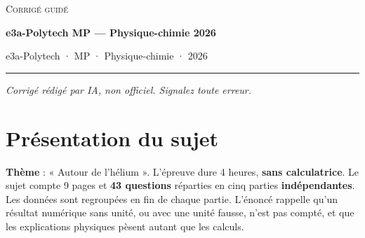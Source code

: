 \documentclass[11pt,a4paper]{article}
\begin{document}
\thispagestyle{plain}
\begin{center}
  {\small\scshape Corrigé guidé}\par\smallskip
  {\LARGE\bfseries e3a-Polytech MP — Physique-chimie 2026\par}\medskip
  {\large e3a-Polytech · MP · Physique-chimie · 2026\par}
\end{center}
\vspace{2pt}\hrule\vspace{8pt}

\emph{Corrigé rédigé par IA, non officiel. Signalez toute erreur.}

\hypertarget{pruxe9sentation-du-sujet}{%
\section{Présentation du sujet}\label{pruxe9sentation-du-sujet}}

\textbf{Thème} : « Autour de l'hélium ». L'épreuve dure 4 heures, \textbf{sans calculatrice}. Le sujet compte 9 pages et \textbf{43 questions} réparties en cinq parties \textbf{indépendantes}. Les données sont regroupées en fin de chaque partie. L'énoncé rappelle qu'un résultat numérique sans unité, ou avec une unité fausse, n'est pas compté, et que les explications physiques pèsent autant que les calculs.
\end{document}
